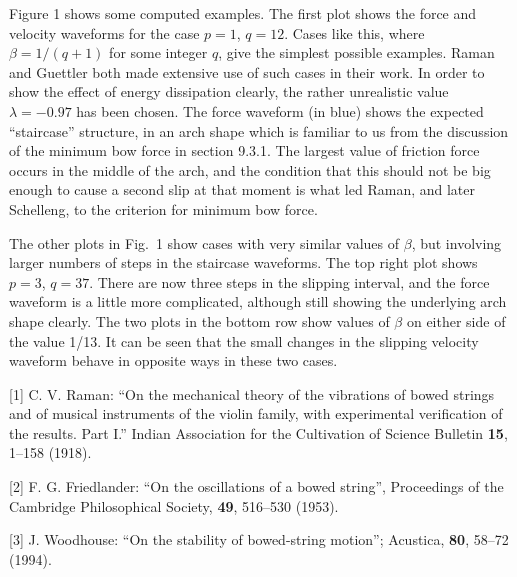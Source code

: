   Figure 1 shows some computed examples. The first plot shows the force and 
  velocity waveforms for the case $p=1$, $q=12$. Cases like this, where 
  $\beta=1/(q+1)$ for some integer $q$, give the simplest possible examples. 
  Raman and Guettler both made extensive use of such cases in their work. In 
  order to show the effect of energy dissipation clearly, the rather 
  unrealistic value $\lambda=-0.97$ has been chosen. The force waveform (in 
  blue) shows the expected ``staircase'' structure, in an arch shape which is 
  familiar to us from the discussion of the minimum bow force in section 9.3.1. 
  The largest value of friction force occurs in the middle of the arch, and the 
  condition that this should not be big enough to cause a second slip at that 
  moment is what led Raman, and later Schelleng, to the criterion for minimum 
  bow force. 

  The other plots in Fig.\ 1 show cases with very similar values of $\beta$, 
  but involving larger numbers of steps in the staircase waveforms. The top 
  right plot shows $p=3$, $q=37$. There are now three steps in the slipping 
  interval, and the force waveform is a little more complicated, although still 
  showing the underlying arch shape clearly. The two plots in the bottom row 
  show values of $\beta$ on either side of the value 1/13. It can be seen that 
  the small changes in the slipping velocity waveform behave in opposite ways 
  in these two cases. 

  \sectionreferences{}[1] C. V. Raman: ``On the mechanical theory of the 
  vibrations of bowed strings and of musical instruments of the violin family, 
  with experimental verification of the results. Part I.'' Indian Association 
  for the Cultivation of Science Bulletin \textbf{15}, 1–158 (1918). 

  [2] F. G. Friedlander: ``On the oscillations of a bowed string'', Proceedings 
  of the Cambridge Philosophical Society, \textbf{49}, 516--530 (1953). 

  [3] J. Woodhouse: ``On the stability of bowed-string motion''; Acustica, 
  \textbf{80}, 58--72 (1994). 